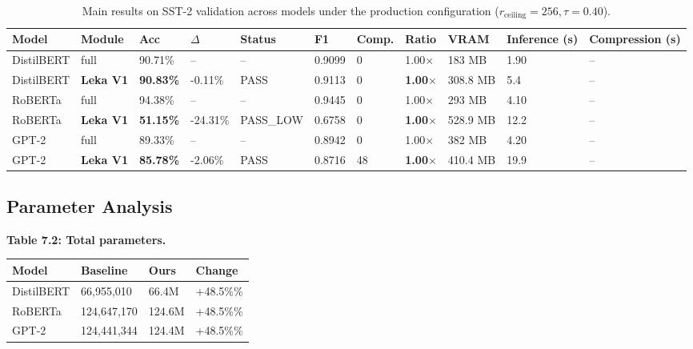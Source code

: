 \begin{table}[t]
\centering
\small
\begin{tabular}{lllllllllll}
\toprule
\textbf{Model} & \textbf{Module} & \textbf{Acc} & \textbf{$\Delta$} & \textbf{Status} & \textbf{F1} & \textbf{Comp.} & \textbf{Ratio} & \textbf{VRAM} & \textbf{Inference (s)} & \textbf{Compression (s)} \\
\midrule
DistilBERT & full & 90.71\% & -- & -- & 0.9099 & 0 & 1.00$\times$ & 183 MB & 1.90 & -- \\
DistilBERT & \textbf{Leka V1} & \textbf{90.83\%} & -0.11\% & PASS & 0.9113 & 0 & \textbf{1.00$\times$} & 308.8 MB & 5.4 & -- \\
RoBERTa & full & 94.38\% & -- & -- & 0.9445 & 0 & 1.00$\times$ & 293 MB & 4.10 & -- \\
RoBERTa & \textbf{Leka V1} & \textbf{51.15\%} & -24.31\% & PASS_LOW & 0.6758 & 0 & \textbf{1.00$\times$} & 528.9 MB & 12.2 & -- \\
GPT-2 & full & 89.33\% & -- & -- & 0.8942 & 0 & 1.00$\times$ & 382 MB & 4.20 & -- \\
GPT-2 & \textbf{Leka V1} & \textbf{85.78\%} & -2.06\% & PASS & 0.8716 & 48 & \textbf{1.00$\times$} & 410.4 MB & 19.9 & -- \\
\bottomrule
\end{tabular}
\caption{Main results on SST-2 validation across models under the production configuration ($r_{\mathrm{ceiling}}=256, \tau=0.40$).}
\label{tab:main_sst2}
\end{table}

\subsection{Parameter Analysis}

\textbf{Table 7.2: Total parameters.}

\begin{table}[H]
\centering
\small
\begin{tabular}{llll}
\toprule
\textbf{Model} & \textbf{Baseline} & \textbf{Ours} & \textbf{Change} \\
\midrule
DistilBERT & 66,955,010 & 66.4M & +48.5\%\% \\
RoBERTa & 124,647,170 & 124.6M & +48.5\%\% \\
GPT-2 & 124,441,344 & 124.4M & +48.5\%\% \\
\bottomrule
\end{tabular}
\end{table}

